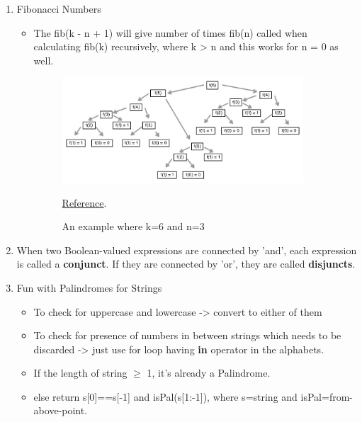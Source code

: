 \documentclass[11pt]{article}
\begin{document}
\begin{enumerate}
        \item Fibonacci Numbers
        \begin{itemize}
            \item The fib(k - n + 1) will give number of times fib(n) called when calculating fib(k) recursively, where k > n and this works for n = 0 as well.
            \begin{figure}[htp]
                \centering
                \includegraphics[width=9cm]{imgs/ex1.jpg}
                \caption{An example where k=6 and n=3} \href{https://stackoverflow.com/questions/63136225/how-many-times-does-fib3-gets-called-when-we-call-fib6-using-the-recursive-a}{Reference}.
                \label{fig:galaxy}
            \end{figure}
        \end{itemize}
        \item When two Boolean-valued expressions are connected by 'and', each expression is called a \textbf{conjunct}. If they are connected by 'or', they are called \textbf{disjuncts}.
        \item Fun with Palindromes for Strings
        \begin{itemize}
            \item To check for uppercase and lowercase -> convert to either of them
            \item To check for presence of numbers in between strings which needs to be discarded -> just use for loop having \textbf{in} operator in the alphabets.
            \item If the length of string $\geq$ 1, it's already a Palindrome.
            \item else return s[0]==s[-1] and isPal(s[1:-1]), where s=string and isPal=from-above-point.
        \end{itemize}
    \end{enumerate}
\end{document}
